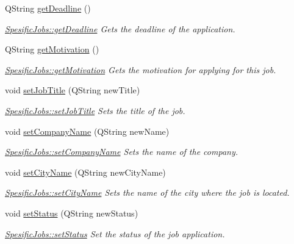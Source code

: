 \begin{DoxyCompactItemize}
Q\+String \mbox{\hyperlink{class_spesific_jobs_a4744022c02271fabfb7fca0015896c09}{get\+Deadline}} ()
\begin{DoxyCompactList}\small\item\em \mbox{\hyperlink{class_spesific_jobs_a4744022c02271fabfb7fca0015896c09}{Spesific\+Jobs\+::get\+Deadline}} Gets the deadline of the application. \end{DoxyCompactList}\item 
Q\+String \mbox{\hyperlink{class_spesific_jobs_a73406f6204c990c3fa3c7b9d16f1b0b9}{get\+Motivation}} ()
\begin{DoxyCompactList}\small\item\em \mbox{\hyperlink{class_spesific_jobs_a73406f6204c990c3fa3c7b9d16f1b0b9}{Spesific\+Jobs\+::get\+Motivation}} Gets the motivation for applying for this job. \end{DoxyCompactList}\item 
void \mbox{\hyperlink{class_spesific_jobs_abb4d8e45e0a2be8197ef03057fc5c714}{set\+Job\+Title}} (Q\+String new\+Title)
\begin{DoxyCompactList}\small\item\em \mbox{\hyperlink{class_spesific_jobs_abb4d8e45e0a2be8197ef03057fc5c714}{Spesific\+Jobs\+::set\+Job\+Title}} Sets the title of the job. \end{DoxyCompactList}\item 
void \mbox{\hyperlink{class_spesific_jobs_aeacc56572911219fddf2f1439a70ed74}{set\+Company\+Name}} (Q\+String new\+Name)
\begin{DoxyCompactList}\small\item\em \mbox{\hyperlink{class_spesific_jobs_aeacc56572911219fddf2f1439a70ed74}{Spesific\+Jobs\+::set\+Company\+Name}} Sets the name of the company. \end{DoxyCompactList}\item 
void \mbox{\hyperlink{class_spesific_jobs_a67b162aa9ad12ed8ffba061edff96cdf}{set\+City\+Name}} (Q\+String new\+City\+Name)
\begin{DoxyCompactList}\small\item\em \mbox{\hyperlink{class_spesific_jobs_a67b162aa9ad12ed8ffba061edff96cdf}{Spesific\+Jobs\+::set\+City\+Name}} Sets the name of the city where the job is located. \end{DoxyCompactList}\item 
void \mbox{\hyperlink{class_spesific_jobs_a439307a28196221b7e3877983077812f}{set\+Status}} (Q\+String new\+Status)
\begin{DoxyCompactList}\small\item\em \mbox{\hyperlink{class_spesific_jobs_a439307a28196221b7e3877983077812f}{Spesific\+Jobs\+::set\+Status}} Set the status of the job application. \end{DoxyCompactList}\item 

\end{DoxyCompactItemize}
